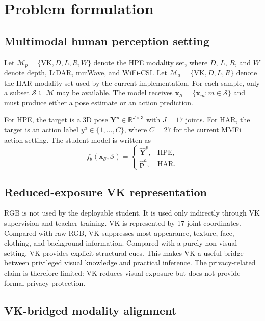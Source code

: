 \documentclass[preprint,12pt]{elsarticle}
\begin{document}
\section{Problem formulation}

\subsection{Multimodal human perception setting}

Let $\mathcal{M}_{p}=\{\mathrm{VK},D,L,R,W\}$ denote the HPE modality set, where $D$, $L$, $R$, and $W$ denote depth, LiDAR, mmWave, and WiFi-CSI. Let $\mathcal{M}_{a}=\{\mathrm{VK},D,L,R\}$ denote the HAR modality set used by the current implementation. For each sample, only a subset $\mathcal{S}\subseteq\mathcal{M}$ may be available. The model receives $\mathbf{x}_{\mathcal{S}}=\{\mathbf{x}_{m}:m\in\mathcal{S}\}$ and must produce either a pose estimate or an action prediction.

For HPE, the target is a 3D pose $\mathbf{Y}^{p}\in \mathbb{R}^{J\times 3}$ with $J=17$ joints. For HAR, the target is an action label $y^{a}\in\{1,\ldots,C\}$, where $C=27$ for the current MMFi action setting. The student model is written as
\begin{equation}
    f_{\theta}(\mathbf{x}_{\mathcal{S}},\mathcal{S}) =
    \begin{cases}
    \hat{\mathbf{Y}}^{p}, & \mathrm{HPE}, \\
    \hat{\mathbf{p}}^{a}, & \mathrm{HAR}.
    \end{cases}
\end{equation}

\subsection{Reduced-exposure VK representation}

RGB is not used by the deployable student. It is used only indirectly through VK supervision and teacher training. VK is represented by 17 joint coordinates. Compared with raw RGB, VK suppresses most appearance, texture, face, clothing, and background information. Compared with a purely non-visual setting, VK provides explicit structural cues. This makes VK a useful bridge between privileged visual knowledge and practical inference. The privacy-related claim is therefore limited: VK reduces visual exposure but does not provide formal privacy protection.

\subsection{VK-bridged modality alignment}
\end{document}
